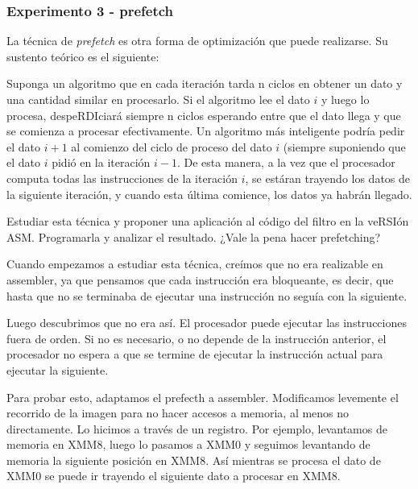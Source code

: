 \vspace*{0.3cm} \noindent
\subsubsection{Experimento 3 - prefetch}

  La técnica de \textit{prefetch} es otra forma de optimización que puede
  realizarse. Su sustento teórico es el siguiente:
  
  Suponga un algoritmo que en cada iteración tarda n ciclos en obtener un dato y una cantidad
  similar en procesarlo. Si el algoritmo lee el dato $i$ y luego lo procesa,
  despeRDIciará siempre n ciclos esperando entre que el dato llega y que se comienza
  a procesar efectivamente. Un algoritmo más inteligente podría pedir el 
  dato $i+1$ al comienzo del ciclo de proceso del dato $i$ (siempre suponiendo
  que el dato $i$ pidió en la iteración $i-1$. De esta manera, a la vez que el
  procesador computa todas las instrucciones de la iteración $i$, se estáran trayendo
  los datos de la siguiente iteración, y cuando esta última comience, los datos ya
  habrán llegado.  \vspace*{0.2cm}

  

  Estudiar esta técnica y proponer una aplicación al código del filtro en la veRSIón ASM.
  Programarla y analizar el resultado. ¿Vale la pena hacer prefetching?\vspace*{0.2cm}
  
  
  
  
  Cuando empezamos a estudiar esta técnica, creímos que no era realizable en assembler, 
  ya que pensamos que cada instrucción era bloqueante, es decir, 
  que hasta que no se terminaba de ejecutar una instrucción no seguía con la siguiente. \vspace*{0.2cm}
 
 
 
  Luego descubrimos que no era así. El procesador puede ejecutar las instrucciones fuera de orden. 
  Si no es necesario, o no depende de la instrucción anterior, el procesador no espera a que se 
  termine de ejecutar la instrucción actual para ejecutar la siguiente.\vspace*{0.2cm}



  Para probar esto, adaptamos el prefecth a assembler. Modificamos levemente el recorrido de la 
  imagen para no hacer accesos a memoria, al menos no directamente. Lo hicimos a través de un registro.
  Por ejemplo, levantamos de memoria en XMM8, luego lo pasamos a XMM0 y seguimos levantando de memoria 
  la siguiente posición en XMM8. Así mientras se procesa el dato de XMM0 se puede ir trayendo el 
  siguiente dato a procesar en XMM8.\vspace*{0.2cm}
  
